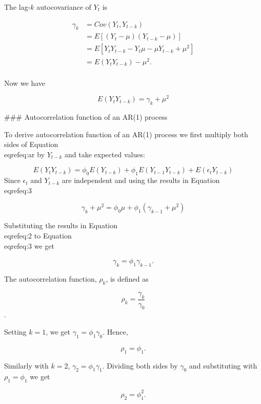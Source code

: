 \documentclass[11pt,a4paper,]{article}
\begin{document}
{The lag-$k$ autocovariance of $Y_t$ is

\begin{equation}
  \label{eq:3}
\begin{aligned}
  \gamma_k &= Cov(Y_t, Y_{t-k}) \\
         &= E[(Y_t-\mu)(Y_{t-k}-\mu)] \\
         &= E[Y_tY_{t-k}-Y_t\mu-\mu Y_{t-k} +\mu^2] \\
         &= E(Y_t Y_{t-k}) - \mu^2. \\
\end{aligned}
\end{equation}

Now we have 

\begin{equation}
  \label{eq:3}
  E(Y_t Y_{t-k}) = \gamma_k + \mu^2
\end{equation}

### Autocorrelation function of an AR(1) process

To derive autocorrelation function of an AR(1) process we first multiply both sides of Equation \\eqref{eq:ar} by $Y_{t-k}$ and take expected values:

$$E(Y_tY_{t-k})=\phi_0E(Y_{t-k})+\phi_1 E(Y_{t-1}Y_{t-k})+E(\epsilon_tY_{t-k})$$
Since $\epsilon_t$ and $Y_{t-k}$ are independent and using the results in Equation \\eqref{eq:3}

$$\gamma_k + \mu^2 = \phi_0 \mu+\phi_1(\gamma_{k-1}+\mu^2)$$

Substituting the results in Equation \\eqref{eq:2} to Equation \\eqref{eq:3} we get

\begin{equation}
\label{eq:5}
\gamma_k = \phi_1 \gamma_{k-1}.
\end{equation}


The autocorrelation function, $\rho_k$, is defined as 

$$\rho_k = \frac{\gamma_k}{\gamma_0}$$.

Setting $k=1$, we get $\gamma_1 = \phi_1\gamma_0.$ Hence,

$$\rho_1=\phi_1.$$

Similarly with $k=2$, $\gamma_2 = \phi_1 \gamma_1$. Dividing both sides by $\gamma_0$ and substituting with $\rho_1=\phi_1$ we get 

$$\rho_2=\phi_1^2.$$

}
\end{document}
